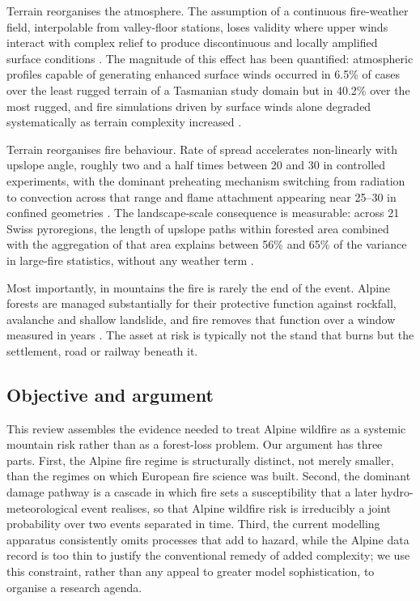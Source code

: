 \documentclass[11pt,a4paper]{article}
\begin{document}
Terrain reorganises the atmosphere. The assumption of a continuous fire-weather field, interpolable from valley-floor stations, loses validity where upper winds interact with complex relief to produce discontinuous and locally amplified surface conditions \citep{sharples_overview_2009}. The magnitude of this effect has been quantified: atmospheric profiles capable of generating enhanced surface winds occurred in 6.5\% of cases over the least rugged terrain of a Tasmanian study domain but in 40.2\% over the most rugged, and fire simulations driven by surface winds alone degraded systematically as terrain complexity increased \citep{ozaki_impact_2022}.

Terrain reorganises fire behaviour. Rate of spread accelerates non-linearly with upslope angle, roughly two and a half times between 20\degree{} and 30\degree{} in controlled experiments, with the dominant preheating mechanism switching from radiation to convection across that range and flame attachment appearing near 25--30\degree{} in confined geometries \citep{hayajneh_wind_2026}. The landscape-scale consequence is measurable: across 21 Swiss pyroregions, the length of upslope paths within forested area combined with the aggregation of that area explains between 56\% and 65\% of the variance in large-fire statistics, without any weather term \citep{conedera_linking_2024}.

Most importantly, in mountains the fire is rarely the end of the event. Alpine forests are managed substantially for their protective function against rockfall, avalanche and shallow landslide, and fire removes that function over a window measured in years \citep{melzner_wildfire-induced_2025, melzner_brief_2019}. The asset at risk is typically not the stand that burns but the settlement, road or railway beneath it.

\subsection{Objective and argument}

This review assembles the evidence needed to treat Alpine wildfire as a systemic mountain risk rather than as a forest-loss problem. Our argument has three parts. First, the Alpine fire regime is structurally distinct, not merely smaller, than the regimes on which European fire science was built. Second, the dominant damage pathway is a cascade in which fire sets a susceptibility that a later hydro-meteorological event realises, so that Alpine wildfire risk is irreducibly a joint probability over two events separated in time. Third, the current modelling apparatus consistently omits processes that add to hazard, while the Alpine data record is too thin to justify the conventional remedy of added complexity; we use this constraint, rather than any appeal to greater model sophistication, to organise a research agenda.
\end{document}
